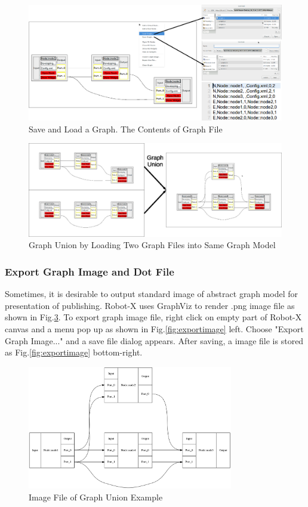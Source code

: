 \documentclass[a4paper,10pt]{book}
\begin{document}
\begin{figure}
 \centering
 \includegraphics[width=1.0\textwidth]{img/saveloadgraph.eps}
 \caption{Save and Load a Graph. The Contents of Graph File}
 \label{fig:saveloadgraph}
\end{figure}

\begin{figure}
 \centering
 \includegraphics[width=1.0\textwidth]{img/graphunion.eps}
 \caption{Graph Union by Loading Two Graph Files into Same Graph Model}
 \label{fig:graphunion}
\end{figure}

\subsubsection{Export Graph Image and Dot File}

Sometimes, it is desirable to output standard image of abstract graph model for presentation of publishing. Robot-X uses GraphViz to render .png image file as shown in Fig.\ref{fig:sample}. To export graph image file, right click on empty part of Robot-X canvas and a menu pop up as shown in Fig.\ref{fig:exportimage} left. Choose "Export Graph Image..." and a save file dialog appears. After saving, a image file is stored as Fig.\ref{fig:exportimage} bottom-right.

\begin{figure}
 \centering
 \includegraphics[width=0.8\textwidth]{img/sample.png}
 \caption{Image File of Graph Union Example}
 \label{fig:sample}
\end{figure}
\end{document}
